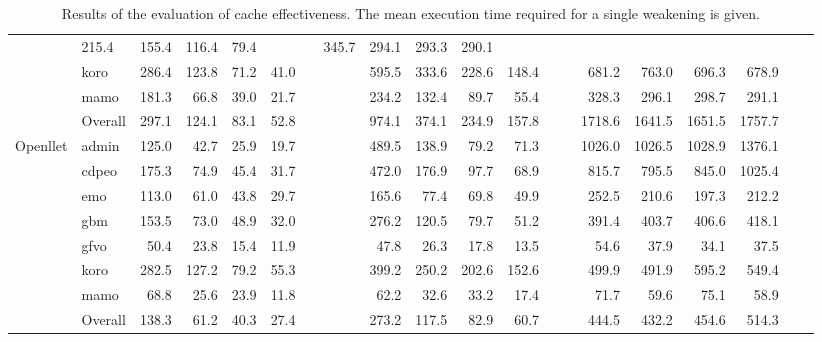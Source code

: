\begin{table}[htbp]
\begin{widepage}[4cm]
\begin{tabular}{|l|l|rrrrrr|rrrrrr|rrrrrr|}
        & 215.4 & 155.4 & 116.4 & 79.4 & &
        & 345.7 & 294.1 & 293.3 & 290.1 & & \\
      & koro
        & 286.4 & 123.8 & 71.2 & 41.0 & &
        & 595.5 & 333.6 & 228.6 & 148.4 & &
        & 681.2 & 763.0 & 696.3 & 678.9 & & \\
      & mamo
        & 181.3 & 66.8 & 39.0 & 21.7 & &
        & 234.2 & 132.4 & 89.7 & 55.4 & &
        & 328.3 & 296.1 & 298.7 & 291.1 & & \\
      \cline{2-20}
      & Overall
        & 297.1 & 124.1 & 83.1 & 52.8 & &
        & 974.1 & 374.1 & 234.9 & 157.8 & &
        & 1718.6 & 1641.5 & 1651.5 & 1757.7 & & \\
      \hline
      \multirow{8}{*}{Openllet} & admin
        & 125.0 & 42.7 & 25.9 & 19.7 & &
        & 489.5 & 138.9 & 79.2 & 71.3 & &
        & 1026.0 & 1026.5 & 1028.9 & 1376.1 & & \\
      & cdpeo
        & 175.3 & 74.9 & 45.4 & 31.7 & &
        & 472.0 & 176.9 & 97.7 & 68.9 & &
        & 815.7 & 795.5 & 845.0 & 1025.4 & & \\
      & emo
        & 113.0 & 61.0 & 43.8 & 29.7 & &
        & 165.6 & 77.4 & 69.8 & 49.9 & &
        & 252.5 & 210.6 & 197.3 & 212.2 & & \\
      & gbm
        & 153.5 & 73.0 & 48.9 & 32.0 & &
        & 276.2 & 120.5 & 79.7 & 51.2 & &
        & 391.4 & 403.7 & 406.6 & 418.1 & & \\
      & gfvo
        & 50.4 & 23.8 & 15.4 & 11.9 & &
        & 47.8 & 26.3 & 17.8 & 13.5 & &
        & 54.6 & 37.9 & 34.1 & 37.5 & & \\
      & koro
        & 282.5 & 127.2 & 79.2 & 55.3 & &
        & 399.2 & 250.2 & 202.6 & 152.6 & &
        & 499.9 & 491.9 & 595.2 & 549.4 & & \\
      & mamo
        & 68.8 & 25.6 & 23.9 & 11.8 & &
        & 62.2 & 32.6 & 33.2 & 17.4 & &
        & 71.7 & 59.6 & 75.1 & 58.9 & & \\
      \cline{2-20}
      & Overall
        & 138.3 & 61.2 & 40.3 & 27.4 & &
        & 273.2 & 117.5 & 82.9 & 60.7 & &
        & 444.5 & 432.2 & 454.6 & 514.3 & & \\
      \hline
    \end{tabular}
  \end{widepage}
  \caption{Results of the evaluation of cache effectiveness. The mean execution time required for a single weakening is given.}
\end{table}

